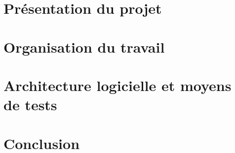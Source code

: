 \documentclass[a4paper,11pt]{article}
\begin{document}
\pagestyle{plain}


\makeTitlePage %

\clearpage

\selectfont

\tableofcontents

\clearpage

\section{Présentation du projet}


\section{Organisation du travail}


\clearpage

\section{Architecture logicielle et moyens de tests}


\clearpage

\section{Conclusion}


\makeAbstractPage
\pagestyle{empty}
\end{document}
